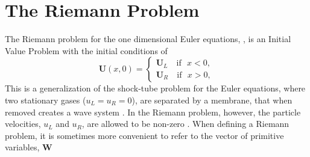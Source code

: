 \section{The Riemann Problem}
The Riemann problem for the one dimensional Euler equations, , is an Initial Value Problem with the initial conditions of
\begin{equation}\label{eqn:RiemannProblem}
	\boldsymbol{U}\left(x,0\right) = \begin{cases}
		\boldsymbol{U}_L\,\,\,\, \textrm{ if } \,\,x < 0,\\
		\boldsymbol{U}_R\,\,\,\, \textrm{ if } \,\,x > 0,
	\end{cases}
\end{equation}
This is a generalization of the shock-tube problem for the Euler equations, where two stationary gases ($u_L=u_R=0$), are separated by a membrane, that when removed creates a wave system \cite{courant1999supersonic}. In the Riemann problem, however, the particle velocities, $u_L$ and $u_R$, are allowed to be non-zero \cite{toro2013riemann}.
When defining a Riemann problem, it is sometimes more convenient to refer to  the vector of primitive variables, $\boldsymbol{W}$
